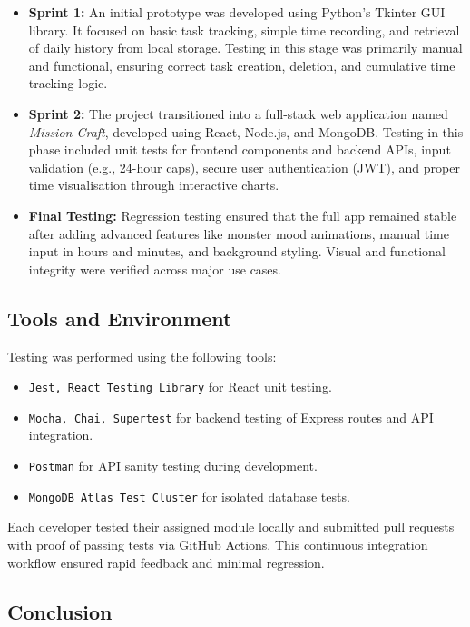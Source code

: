 \documentclass[12pt,a4paper]{article}
\begin{document}
\begin{itemize}
    \item \textbf{Sprint 1:} An initial prototype was developed using Python's Tkinter GUI library. It focused on basic task tracking, simple time recording, and retrieval of daily history from local storage. Testing in this stage was primarily manual and functional, ensuring correct task creation, deletion, and cumulative time tracking logic.
    
    \item \textbf{Sprint 2:} The project transitioned into a full-stack web application named \textit{Mission Craft}, developed using React, Node.js, and MongoDB. Testing in this phase included unit tests for frontend components and backend APIs, input validation (e.g., 24-hour caps), secure user authentication (JWT), and proper time visualisation through interactive charts.

    \item \textbf{Final Testing:} Regression testing ensured that the full app remained stable after adding advanced features like monster mood animations, manual time input in hours and minutes, and background styling. Visual and functional integrity were verified across major use cases.
\end{itemize}


\subsection{Tools and Environment}

Testing was performed using the following tools:
\begin{itemize}
    \item \texttt{Jest, React Testing Library} for React unit testing.
    \item \texttt{Mocha, Chai, Supertest} for backend testing of Express routes and API integration.
    \item \texttt{Postman} for API sanity testing during development.
    \item \texttt{MongoDB Atlas Test Cluster} for isolated database tests.
\end{itemize}

Each developer tested their assigned module locally and submitted pull requests with proof of passing tests via GitHub Actions. This continuous integration workflow ensured rapid feedback and minimal regression.

\subsection{Conclusion}
\end{document}
